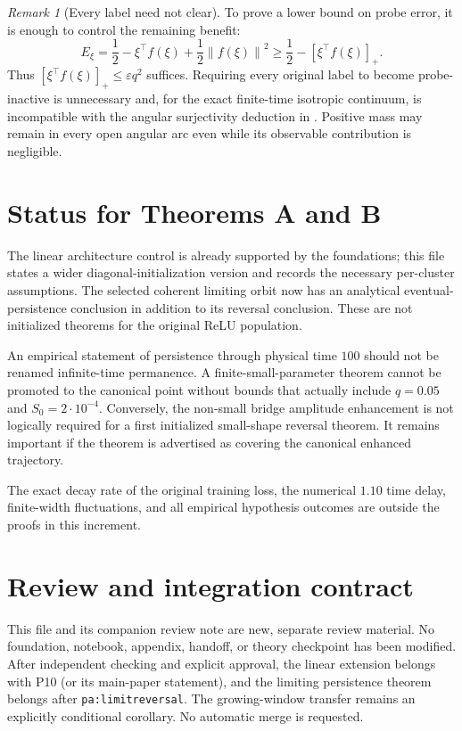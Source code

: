 \documentclass[11pt]{article}
\numberwithin{equation}{section}
\theoremstyle{remark}\newtheorem{remark}[theorem]{Remark}
\newcommand{\norm}[1]{\left\lVert#1\right\rVert}
\begin{document}
\begin{remark}[Every label need not clear]
To prove a lower bound on probe error, it is enough to control the
remaining benefit:
\[
 E_\xi=\frac12-\xi^\top f(\xi)+\frac12\norm{f(\xi)}^2
 \ge\frac12-[\xi^\top f(\xi)]_+.
\]
Thus $[\xi^\top f(\xi)]_+\le\varepsilon q^2$ suffices. Requiring every
original label to become probe-inactive is unnecessary and, for the exact
finite-time isotropic continuum, is incompatible with the angular
surjectivity deduction in \cite{R}. Positive mass may remain in every open
angular arc even while its observable contribution is negligible.
\end{remark}

\section{Status for Theorems A and B}
\label{inc:LP:v1:status-final}
The linear architecture control is already supported by the foundations;
this file states a wider diagonal-initialization version and records the
necessary per-cluster assumptions. The selected coherent limiting orbit
now has an analytical eventual-persistence conclusion in addition to its
reversal conclusion. These are not initialized theorems for the original
ReLU population.

An empirical statement of persistence through physical time $100$ should
not be renamed infinite-time permanence. A finite-small-parameter theorem
cannot be promoted to the canonical point without bounds that actually
include $q=0.05$ and $S_0=2\cdot10^{-4}$. Conversely, the non-small bridge
amplitude enhancement is not logically required for a first initialized
small-shape reversal theorem. It remains important if the theorem is
advertised as covering the canonical enhanced trajectory.

The exact decay rate of the original training loss, the numerical
$1.10$ time delay, finite-width fluctuations, and all empirical hypothesis
outcomes are outside the proofs in this increment.

\section*{Review and integration contract}
This file and its companion review note are new, separate review material.
No foundation, notebook, appendix, handoff, or theory checkpoint has been
modified. After independent checking and explicit approval, the linear
extension belongs with P10 (or its main-paper statement), and the limiting
persistence theorem belongs after \texttt{pa:limitreversal}. The growing-window
transfer remains an explicitly conditional corollary. No automatic merge is
requested.
\end{document}
